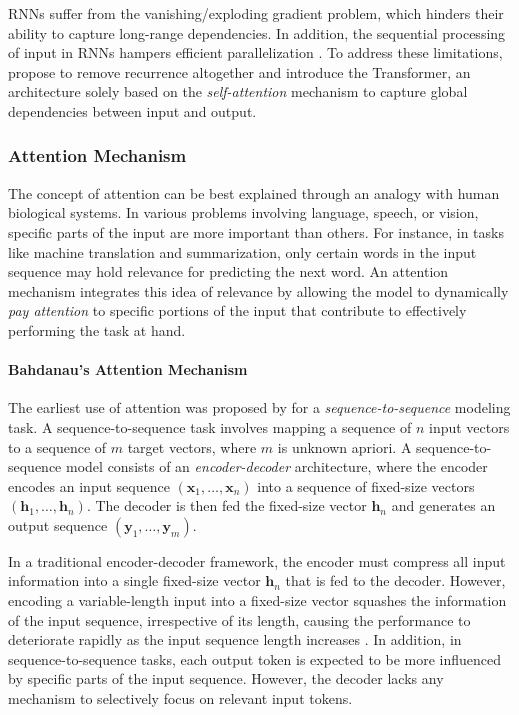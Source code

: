 \acp{RNN} suffer from the vanishing/exploding gradient problem, which hinders their ability to capture long-range dependencies. In addition, the sequential processing of input in \acp{RNN} hampers efficient parallelization \citep{vaswani2017attention}. To address these limitations, \citet{vaswani2017attention} propose to remove recurrence altogether and introduce the Transformer, an architecture solely based on the \textit{self-attention} mechanism to capture global dependencies between input and output. 

\subsubsection{Attention Mechanism} 

The concept of attention can be best explained through an analogy with human biological systems. In various problems involving language, speech, or vision, specific parts of the input are more important than others. For instance, in tasks like machine translation and summarization, only certain words in the input sequence may hold relevance for predicting the next word. An attention mechanism integrates this idea of relevance by allowing the model to dynamically \textit{pay attention} to specific portions of the input that contribute to effectively performing the task at hand.

\paragraph{Bahdanau's Attention Mechanism} The earliest use of attention was proposed by \citet{bahdanau2014neural} for a \textit{sequence-to-sequence} modeling task. A sequence-to-sequence task involves mapping a sequence of $n$ input vectors to a sequence of $m$ target vectors, where $m$ is unknown apriori. A sequence-to-sequence model \citep{sutskever2014sequence} consists of an \textit{encoder-decoder} architecture, where the encoder encodes an input sequence $(\bm{x}_1, \ldots, \bm{x}_n)$ into a sequence of fixed-size vectors $(\bm{h}_1, \ldots, \bm{h}_n)$. The decoder is then fed the fixed-size vector $\bm{h}_n$ and generates an output sequence $(\bm{y}_1, \ldots, \bm{y}_m)$.

In a traditional encoder-decoder framework, the encoder must compress all input information into a single fixed-size vector $\bm{h}_n$ that is fed to the decoder. However, encoding a variable-length input into a fixed-size vector squashes the information of the input sequence, irrespective of its length, causing the performance to deteriorate rapidly as the input sequence length increases \citep{cho2014properties}. In addition, in sequence-to-sequence tasks, each output token is expected to be more influenced by specific parts of the input sequence. However, the decoder lacks any mechanism to selectively focus on relevant input tokens.

